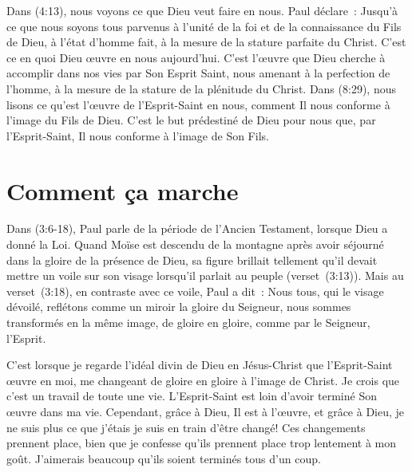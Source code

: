 Dans (4:13), nous voyons ce que Dieu veut faire en nous.
 Paul déclare~:
 \og Jusqu'à ce que nous soyons tous parvenus à l'unité de la foi
 et de la connaissance du Fils de Dieu, à l'état d'homme fait,
 à la mesure de la stature parfaite du Christ. \fg{}
 C'est ce en quoi Dieu œuvre en nous aujourd'hui.
 C'est l'œuvre que Dieu cherche à accomplir dans nos vies
 par Son Esprit Saint, nous amenant à la perfection de l'homme,
 à la mesure de la stature de la plénitude du Christ.
 Dans (8:29), nous lisons
 ce qu'est l'œuvre de l'Esprit-Saint en nous,
 comment Il nous conforme à l'image du Fils de Dieu.
 C'est le but prédestiné de Dieu pour nous
 que, par l'Esprit-Saint, Il nous conforme à l'image de Son Fils.


\section{Comment \c{c}a marche}

\begin{specialpar}{}
Dans (3:6-18), Paul parle de la période
 de l'Ancien Testament, lorsque Dieu a donné la Loi.
 Quand Moïse est descendu de la montagne après avoir séjourné
 dans la gloire de la présence de Dieu,
 sa figure brillait tellement qu'il devait mettre un voile sur son visage
 lorsqu'il parlait au peuple (verset~(3:13)).
 Mais au verset~(3:18), en contraste avec ce voile,
 Paul a dit~:
 \og Nous tous, qui le visage dévoilé, reflétons comme un miroir
 la gloire du Seigneur, nous sommes transformés en la même image,
 de gloire en gloire, comme par le Seigneur,
 l'Esprit. \fg{}
\end{specialpar}

C'est lorsque je regarde l'idéal divin de Dieu en Jésus-Christ
 que l'Esprit-Saint œuvre en moi, me changeant de gloire en gloire
 à l'image de Christ.
 Je crois que c'est un travail de toute une vie.
 L'Es\-prit-Saint est loin d'avoir terminé Son œuvre dans ma vie.
 Cependant, grâce à Dieu, Il est à l'œuvre, et grâce à Dieu,
 je ne suis plus ce que j'étais
 \ocadr je suis en train d'être changé!
 Ces changements prennent place, bien que je confesse qu'ils prennent place
 trop lentement à mon goût.
 J'aimerais beaucoup qu'ils soient terminés tous d'un coup.

